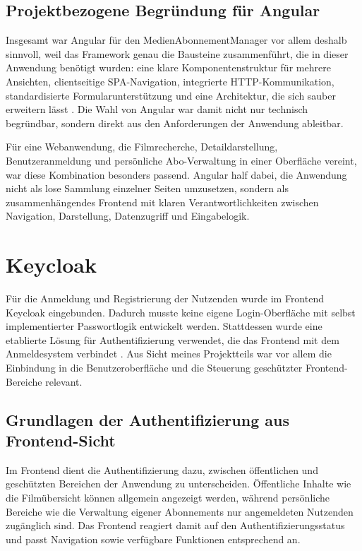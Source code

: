 \subsection{Projektbezogene Begr\"undung f\"ur Angular}
Insgesamt war Angular f\"ur den MedienAbonnementManager vor allem deshalb sinnvoll, weil das Framework genau die Bausteine zusammenf\"uhrt, die in dieser Anwendung ben\"otigt wurden: eine klare Komponentenstruktur f\"ur mehrere Ansichten, clientseitige SPA-Navigation, integrierte HTTP-Kommunikation, standardisierte Formularunterst\"utzung und eine Architektur, die sich sauber erweitern l\"asst \cite{angular_overview,angular_routing,angular_http,angular_components,angular_forms}. Die Wahl von Angular war damit nicht nur technisch begr\"undbar, sondern direkt aus den Anforderungen der Anwendung ableitbar.

F\"ur eine Webanwendung, die Filmrecherche, Detaildarstellung, Benutzeranmeldung und pers\"onliche Abo-Verwaltung in einer Oberfl\"ache vereint, war diese Kombination besonders passend. Angular half dabei, die Anwendung nicht als lose Sammlung einzelner Seiten umzusetzen, sondern als zusammenh\"angendes Frontend mit klaren Verantwortlichkeiten zwischen Navigation, Darstellung, Datenzugriff und Eingabelogik.

\section{Keycloak}
F\"ur die Anmeldung und Registrierung der Nutzenden wurde im Frontend Keycloak eingebunden. Dadurch musste keine eigene Login-Oberfl\"ache mit selbst implementierter Passwortlogik entwickelt werden. Stattdessen wurde eine etablierte L\"osung f\"ur Authentifizierung verwendet, die das Frontend mit dem Anmeldesystem verbindet \cite{keycloak_docs,keycloak_home}. Aus Sicht meines Projektteils war vor allem die Einbindung in die Benutzeroberfl\"ache und die Steuerung gesch\"utzter Frontend-Bereiche relevant.

\subsection{Grundlagen der Authentifizierung aus Frontend-Sicht}
Im Frontend dient die Authentifizierung dazu, zwischen \"offentlichen und gesch\"utzten Bereichen der Anwendung zu unterscheiden. \"Offentliche Inhalte wie die Film\"ubersicht k\"onnen allgemein angezeigt werden, w\"ahrend pers\"onliche Bereiche wie die Verwaltung eigener Abonnements nur angemeldeten Nutzenden zug\"anglich sind. Das Frontend reagiert damit auf den Authentifizierungsstatus und passt Navigation sowie verf\"ugbare Funktionen entsprechend an.

